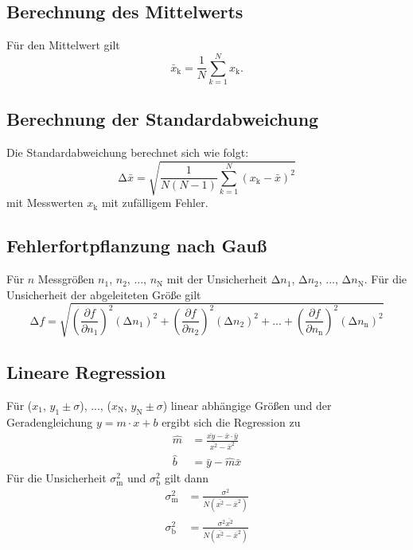 \subsection{Berechnung des Mittelwerts}
  \label{sec:mittelwert}
  Für den Mittelwert gilt
  \begin{equation}
    \bar{x}_\text{k} = \frac{1}{N} \sum_{k = 1}^{N} x_\text{k}.
  \end{equation}
\subsection{Berechnung der Standardabweichung}
  \label{sec:standardabweichung}
  Die Standardabweichung berechnet sich wie folgt:
  \begin{equation}
    \increment \bar{x} = \sqrt{\frac{1}{N(N-1)} \sum_{k = 1}^{N}(x_\text{k} - \bar{x})^2 }
  \end{equation}
  mit Messwerten $x_\text{k}$ mit zufälligem Fehler.
\subsection{Fehlerfortpflanzung nach Gauß}
  \label{sec:fehlerfortpflanzung}
  Für $n$ Messgrößen $n_\text{1}$, $n_\text{2}$, ..., $n_\text{N}$ mit der Unsicherheit
  $\increment n_\text{1}$, $\increment n_\text{2}$, ..., $\increment n_\text{N}$. Für die Unsicherheit
  der abgeleiteten Größe gilt
  \begin{equation}
    \increment f = \sqrt{\left(\frac{\partial f}{\partial n_\text{1}} \right)^2 (\increment n_\text{1})^2 + \left(\frac{\partial f}{\partial n_\text{2}} \right)^2 (\increment
    n_\text{2})^2 + ... + \left(\frac{\partial
    f}{\partial  n_\text{n}} \right)^2 (\increment  n_\text{n})^2}
  \end{equation}
\subsection{Lineare Regression}
  \label{sec:regression}
  Für ($x_\text{1}$, $y_\text{1} \pm \sigma$), ..., ($x_\text{N}$, $y_\text{N} \pm \sigma$) linear abhängige Größen und der Geradengleichung $y = m \cdot x + b$ ergibt sich die
  Regression zu
  \begin{align}
    \hat{m}  & = \frac{\bar{xy} - \bar{x} \cdot \bar{y}}{\bar{x^2} - \bar{x}^2} \\
    \hat{b}  & = \bar{y} - \hat{m} \bar{x}
  \end{align}
  Für die Unsicherheit $\sigma_\text{m}^2$ und $\sigma_\text{b}^2$ gilt dann
  \begin{align}
    \sigma_\text{m}^2 & = \frac{\sigma^2}{N(\bar{x^2} - \bar{x}^2)} \\
    \sigma_\text{b}^2 & = \frac{\sigma^2 \bar{x^2}}{N(\bar{x^2} - \bar{x}^2)}
  \end{align}
